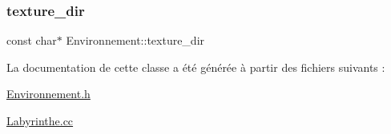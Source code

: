 \subsubsection{\texorpdfstring{texture\+\_\+dir}{texture\_dir}}
{\footnotesize\ttfamily const char$\ast$ Environnement\+::texture\+\_\+dir\hspace{0.3cm}{\ttfamily [static]}}



La documentation de cette classe a été générée à partir des fichiers suivants \+:\begin{DoxyCompactItemize}
\item 
\hyperlink{Environnement_8h}{Environnement.\+h}\item 
\hyperlink{Labyrinthe_8cc}{Labyrinthe.\+cc}\end{DoxyCompactItemize}
